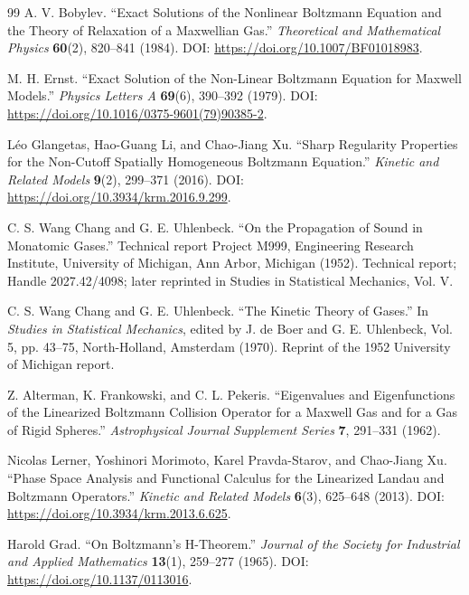 \documentclass[11pt,oneside]{article}
\numberwithin{equation}{section}
\theoremstyle{definition}
\begin{document}
\begin{thebibliography}{99}
A. V. Bobylev. ``Exact Solutions of the Nonlinear Boltzmann Equation and the Theory of Relaxation of a Maxwellian Gas.'' \emph{Theoretical and Mathematical Physics} \textbf{60}(2), 820--841 (1984). DOI: \url{https://doi.org/10.1007/BF01018983}.

M. H. Ernst. ``Exact Solution of the Non-Linear Boltzmann Equation for Maxwell Models.'' \emph{Physics Letters A} \textbf{69}(6), 390--392 (1979). DOI: \url{https://doi.org/10.1016/0375-9601(79)90385-2}.

L{\'e}o Glangetas, Hao-Guang Li, and Chao-Jiang Xu. ``Sharp Regularity Properties for the Non-Cutoff Spatially Homogeneous Boltzmann Equation.'' \emph{Kinetic and Related Models} \textbf{9}(2), 299--371 (2016). DOI: \url{https://doi.org/10.3934/krm.2016.9.299}.

C. S. Wang Chang and G. E. Uhlenbeck. ``On the Propagation of Sound in Monatomic Gases.'' Technical report Project M999, Engineering Research Institute, University of Michigan, Ann Arbor, Michigan (1952). Technical report; Handle 2027.42/4098; later reprinted in Studies in Statistical Mechanics, Vol. V.

C. S. Wang Chang and G. E. Uhlenbeck. ``The Kinetic Theory of Gases.'' In \emph{Studies in Statistical Mechanics}, edited by J. de Boer and G. E. Uhlenbeck, Vol. 5, pp. 43--75, North-Holland, Amsterdam (1970). Reprint of the 1952 University of Michigan report.

Z. Alterman, K. Frankowski, and C. L. Pekeris. ``Eigenvalues and Eigenfunctions of the Linearized Boltzmann Collision Operator for a Maxwell Gas and for a Gas of Rigid Spheres.'' \emph{Astrophysical Journal Supplement Series} \textbf{7}, 291--331 (1962).

Nicolas Lerner, Yoshinori Morimoto, Karel Pravda-Starov, and Chao-Jiang Xu. ``Phase Space Analysis and Functional Calculus for the Linearized Landau and Boltzmann Operators.'' \emph{Kinetic and Related Models} \textbf{6}(3), 625--648 (2013). DOI: \url{https://doi.org/10.3934/krm.2013.6.625}.

Harold Grad. ``On Boltzmann's H-Theorem.'' \emph{Journal of the Society for Industrial and Applied Mathematics} \textbf{13}(1), 259--277 (1965). DOI: \url{https://doi.org/10.1137/0113016}.


\end{thebibliography}
\end{document}
